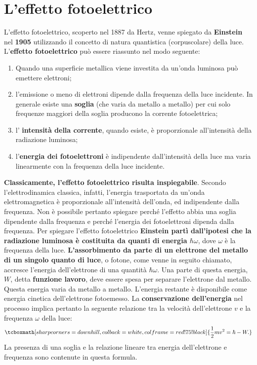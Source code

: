 \documentclass[a4paper,12pt,oneside]{book}
\begin{document}
\section{L'effetto fotoelettrico}
L'effetto fotoelettrico, scoperto nel 1887 da Hertz, venne spiegato da \textbf{Einstein} nel \textbf{1905} utilizzando il concetto di natura quantistica (corpuscolare) della luce.\\
L'\textbf{effetto fotoelettrico} può essere riassunto nel modo seguente:
\begin{enumerate}
\item Quando una superficie metallica viene investita da un'onda luminosa può emettere elettroni;
\item  l'emissione o meno di elettroni dipende dalla frequenza della luce incidente. In generale esiste una \textbf{soglia} (che varia da metallo a metallo) per cui solo frequenze maggiori della soglia producono la corrente fotoelettrica;
\item l' \textbf{intensità della corrente}, quando esiste, è proporzionale all'intensità della radiazione luminosa;
\item l'\textbf{energia dei fotoelettroni} è indipendente dall'intensità della luce ma varia linearmente con la frequenza della luce incidente.
\end{enumerate} 
\textbf{Classicamente, l'effetto fotoelettrico risulta inspiegabile}. Secondo l'elettrodinamica classica, infatti, l'energia trasportata da un'onda elettromagnetica è proporzionale all'intensità dell'onda, ed indipendente dalla frequenza. Non è possibile pertanto spiegare perché l'effetto abbia una soglia dipendente dalla frequenza e perché l'energia dei fotoelettroni dipenda dalla frequenza. Per spiegare l'effetto fotoelettrico \textbf{Einstein partì dall'ipotesi che la radiazione luminosa è costituita da quanti di energia $\hbar \omega$}, dove $\omega$ è la frequenza della luce. \textbf{L'assorbimento da parte di un elettrone del metallo di un singolo quanto di luce}, o fotone, come venne in seguito chiamato, accresce l'energia dell'elettrone di una quantità $\hbar \omega$. Una parte di questa energia, $W$, detta \textbf{funzione lavoro}, deve essere spesa per separare l'elettrone dal metallo. Questa energia varia da metallo a metallo. L'energia restante è disponibile come energia cinetica dell'elettrone fotoemesso. La \textbf{conservazione dell'energia} nel processo implica pertanto la seguente relazione tra la velocità dell'elettrone $v$ e la frequenza $\omega$ della luce:
	\begin{equation}
		\tcboxmath[sharp corners=downhill ,colback=white,colframe=red!75!black]{
			\frac{1}{2}m v^2= \hbar - W.
			}
	\end{equation}
La presenza di una soglia e la relazione lineare tra energia dell'elettrone e frequenza sono contenute in questa formula.\\
\end{document}

